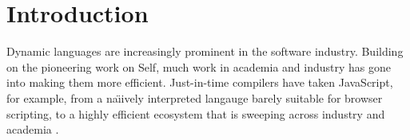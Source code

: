 
\section{Introduction}
\label{sec:introduction}

%
%

Dynamic languages are increasingly prominent in the software industry.
Building on the pioneering work on Self\citep{Self}, 
much work in academia and industry
has gone into making them more efficient\citep{Bolz2013,Bolz:2013:IMT,Wurthinger:2017:PPE,Daloze2016,Clifford:2015:MM,Degenbaev:2016:ITG}.
Just-in-time compilers have taken JavaScript, for example, from a
na{\"\i}ively interpreted langauge barely suitable for browser scripting, 
to a highly efficient ecosystem that is sweeping  across industry
and academia \cite{githut2018}.


